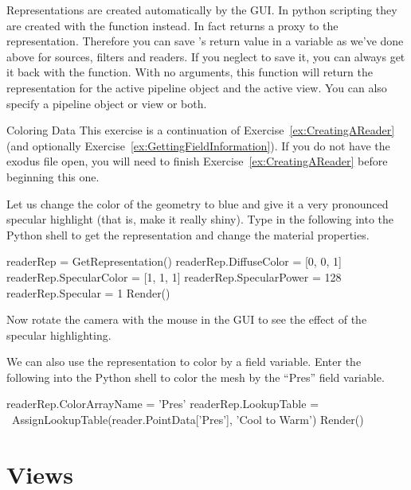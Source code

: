 Representations are created automatically by the GUI. In python scripting
they are created with the  function instead.
In fact  returns a proxy to the
representation.
Therefore you can save 's return value in a variable as we've
done above for sources, filters and readers.
If you neglect to save it, you can always get it back with the
 function.  With no arguments, this function will
return the representation for the active pipeline object and the active
view.  You can also specify a pipeline object or view or both.

\begin{exercise}{Coloring Data}
  \label{ex:ColoringData}%
  This exercise is a continuation of Exercise~\ref{ex:CreatingAReader} (and
  optionally Exercise~\ref{ex:GettingFieldInformation}). If you do not have
  the exodus file open, you will need to finish
  Exercise~\ref{ex:CreatingAReader} before beginning this one.

  Let us change the color of the geometry to blue and give it a very
  pronounced specular highlight (that is, make it
  really shiny).  Type in the following into the Python shell
  to get the representation and change the material properties.

  \begin{python}
readerRep = GetRepresentation()
readerRep.DiffuseColor = [0, 0, 1]
readerRep.SpecularColor = [1, 1, 1]
readerRep.SpecularPower = 128
readerRep.Specular = 1
Render()
  \end{python}

  Now rotate the camera with the mouse in the GUI to see the effect of the
  specular highlighting.

  We can also use the representation to color by a field variable.  Enter
  the following into the Python shell to color the mesh by the ``Pres''
  field variable.

  \begin{python}
readerRep.ColorArrayName = 'Pres'
readerRep.LookupTable = \
  AssignLookupTable(reader.PointData['Pres'], 'Cool to Warm')
Render()
  \end{python}
\end{exercise}

\section{Views}
\label{sec:Views}


